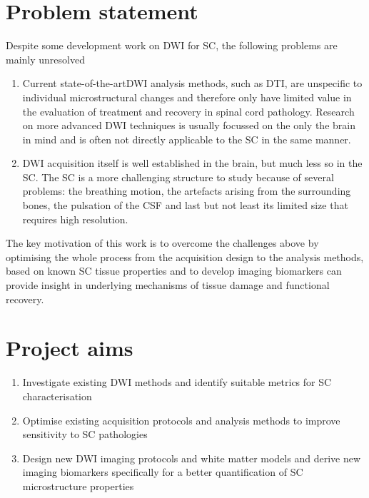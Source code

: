 \section{Problem statement}
Despite some development work on \gls{DWI} for \gls{SC}, the following problems are mainly unresolved 
\begin{enumerate}
\item Current state-of-the-art\gls{DWI} analysis methods, such as \gls{DTI}, are unspecific to individual microstructural changes and therefore only have limited value in the evaluation of treatment and recovery in spinal cord pathology. Research on more advanced \gls{DWI} techniques is usually focussed on the only the brain in mind and is often not directly applicable to the \gls{SC} in the same manner.
\item \gls{DWI} acquisition itself is well established in the brain, but much less so in the \gls{SC}. The \gls{SC} is a more challenging structure to study because of several problems: the breathing motion, the artefacts arising from the surrounding bones, the pulsation of the {\gls{CSF}} and last but not least its limited size that requires high resolution.  
\end{enumerate} 
The key motivation of this work is to overcome the challenges above by optimising the whole process from the acquisition design to the analysis methods, based on known \gls{SC} tissue properties and to develop imaging biomarkers can provide insight in underlying mechanisms of tissue damage and functional recovery.

\section{Project aims}
\begin{enumerate}
  \item Investigate existing \gls{DWI} methods and identify suitable metrics for \gls{SC} characterisation
  \item Optimise existing acquisition protocols and analysis methods to improve sensitivity to \gls{SC} pathologies
  \item Design new \gls{DWI} imaging protocols and white matter models and derive new imaging biomarkers specifically for a better quantification of \gls{SC} microstructure properties
\end{enumerate}

